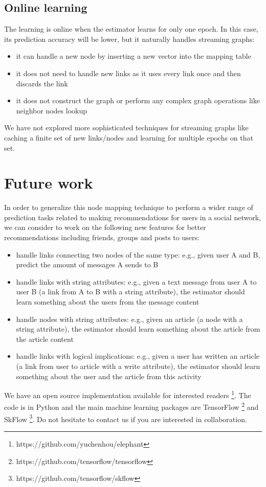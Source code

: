\documentclass[twocolumn]{article}
\begin{document}
\subsection{Online learning}
The learning is online when the estimator learns for only one epoch. In 
this case, its prediction accuracy will be lower, but it naturally handles 
streaming graphs:
\begin{itemize}
	\item it can handle a new node by inserting a new vector into the mapping 
	table
	\item it does not need to handle new links as it uses every link once and 
	then discards the link
	\item it does not construct the graph or perform any complex graph 
	operations like neighbor nodes lookup
\end{itemize}
We have not explored more sophisticated techniques for streaming graphs like 
caching a finite set of new links/nodes and learning for multiple epochs on 
that set.

\section{Future work}
In order to generalize this node mapping technique to perform a wider range of 
prediction tasks related to making recommendations for users in a social 
network,
we can consider to work on the following new features for better 
recommendations including friends, groups and posts to users:
\begin{itemize}
	\item handle links connecting two nodes of the same type: e.g., given user 
	A and B, predict the amount of messages A sends to B
	\item handle links with string attributes: e.g., given a text message from 
	user A to user B (a link from A to B with a string attribute), the 
	estimator should learn something about the users from the message content
	\item handle nodes with string attributes: e.g., given an article (a node 
	with a string attribute), the estimator should learn something about the 
	article from the article content
	\item handle links with logical implications: e.g., given a user has 
	written an article (a link from user to article with a write attribute), 
	the estimator should learn something about the user and the article from 
	this activity
\end{itemize}
We have an open source implementation available for interested readers  
\footnote{https://github.com/yuchenhou/elephant}.
The code is in Python and the main machine learning packages are TensorFlow 
\cite{abadi2016tensorflow} \footnote{https://github.com/tensorflow/tensorflow} 
and SkFlow \footnote{https://github.com/tensorflow/skflow}.
Do not hesitate to contact us if you are interested in collaboration.
\end{document}
